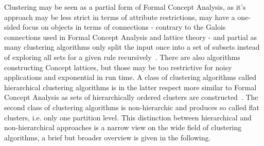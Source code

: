 Clustering may be seen as a partial form of Formal Concept Analysis, as it's approach may be less strict in terms of attribute restrictions, may have a one-sided focus on objects in terms of connections - contrary to the Galois connections used in Formal Concept Analysis and lattice theory - and partial as many clustering algorithms only split the input once into a set of subsets instead of exploring all sets for a given rule recursively~\cite{ignatov2012concept}.
There are also algorithms constructing Concept lattices, but those may be too restrictive for noisy applications and exponential in run time\cite{doi:10.1111/j.1467-8640.1995.tb00031.x}. A class of clustering algorithms called hierarchical clustering algorithms is in the latter respect more similar to Formal Concept Analysis as sets of hierarchically ordered clusters are constructed~\cite{Murtagh_2012}.
The second class of clustering algorithms is non-hierarchic and produces so called flat clusters, i.e. only one partition level. This distinction between hierarchical and non-hierarchical approaches is a narrow view on the wide field of clustering algorithms, a brief but broader overview is given in the following.

